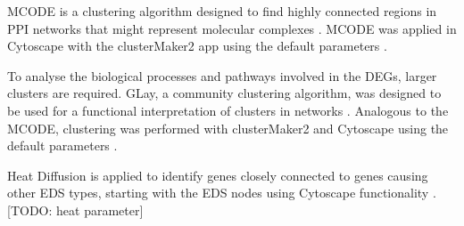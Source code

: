 \begin{description}[leftmargin=5pt]
	\begin{description}[leftmargin=5pt]
		\item[MCODE]MCODE is a clustering algorithm designed to find highly connected regions in PPI networks that might represent molecular complexes \cite{mcode}. MCODE was applied in Cytoscape with the clusterMaker2 app using the default parameters \cite{clusterMaker2}.
		
		\item[Community Clustering]To analyse the biological processes and pathways involved in the DEGs, larger clusters are required. GLay, a community clustering algorithm, was designed to be used for a functional interpretation of clusters in networks \cite{GLay}. Analogous to the MCODE, clustering was performed with clusterMaker2 and Cytoscape using the default parameters \cite{Cytoscape, clusterMaker2}.
		
		Heat Diffusion is applied to identify genes closely connected to genes causing other EDS types, starting with the EDS nodes using Cytoscape functionality \cite{heatDiffusion}. [TODO: heat parameter]
	\end{description}
\end{description}


